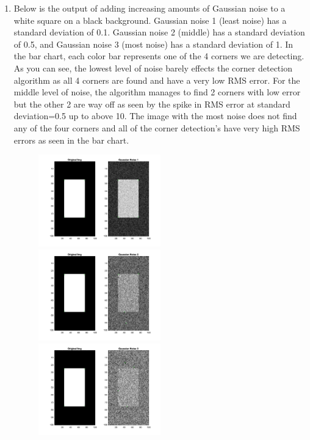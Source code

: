 \documentclass[12pt]{article}
\begin{document}
\begin{enumerate}
	
	\item Below is the output of adding increasing amounts of Gaussian noise to a white square on a black background. Gaussian noise 1 (least noise) has a standard deviation of 0.1. Gaussian noise 2 (middle) has a standard deviation of 0.5, and Gaussian noise 3 (most noise) has a standard deviation of 1. In the bar chart, each color bar represents one of the 4 corners we are detecting. As you can see, the lowest level of noise barely effects the corner detection algorithm as all 4 corners are found and have a very low RMS error. For the middle level of noise, the algorithm manages to find 2 corners with low error but the other 2 are way off as seen by the spike in RMS error at standard deviation=0.5 up to above 10. The image with the most noise does not find any of the four corners and all of the corner detection's have very high RMS errors as seen in the bar chart.
	\begin{figure}[H]
		\includegraphics[width=0.5\textwidth]{Q6C_gaussian1_results.jpg}
		\includegraphics[width=0.5\textwidth]{Q6C_gaussian2_results.jpg}
		\includegraphics[width=0.5\textwidth]{Q6C_gaussian3_results.jpg}

\end{figure}
\end{enumerate}
\end{document}
